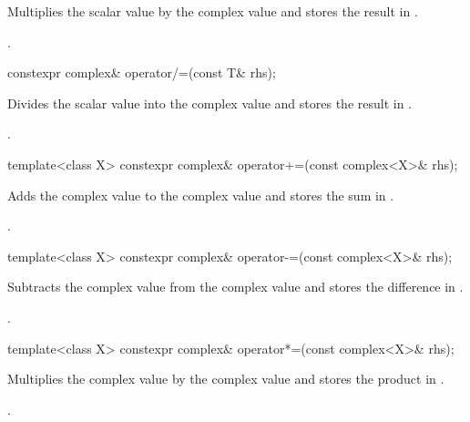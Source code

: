 \begin{itemdescr}
\pnum
\effects
Multiplies the scalar value  by the complex value
and stores the result in
.

\pnum
\returns
{}.
\end{itemdescr}

%
\begin{itemdecl}
constexpr complex& operator/=(const T& rhs);
\end{itemdecl}

\begin{itemdescr}
\pnum
\effects
Divides the scalar value  into the complex value
and stores the result in
.

\pnum
\returns
{}.
\end{itemdescr}

%
\begin{itemdecl}
template<class X> constexpr complex& operator+=(const complex<X>& rhs);
\end{itemdecl}

\begin{itemdescr}
\pnum
\effects
Adds the complex value  to the complex value
and stores the sum in
.

\pnum
\returns
{}.
\end{itemdescr}

%
\begin{itemdecl}
template<class X> constexpr complex& operator-=(const complex<X>& rhs);
\end{itemdecl}

\begin{itemdescr}
\pnum
\effects
Subtracts the complex value  from the complex value
and stores the difference in
.

\pnum
\returns
{}.
\end{itemdescr}

%
\begin{itemdecl}
template<class X> constexpr complex& operator*=(const complex<X>& rhs);
\end{itemdecl}

\begin{itemdescr}
\pnum
\effects
Multiplies the complex value  by the complex value
and stores the product in
.

\pnum
\returns
{}.
\end{itemdescr}

